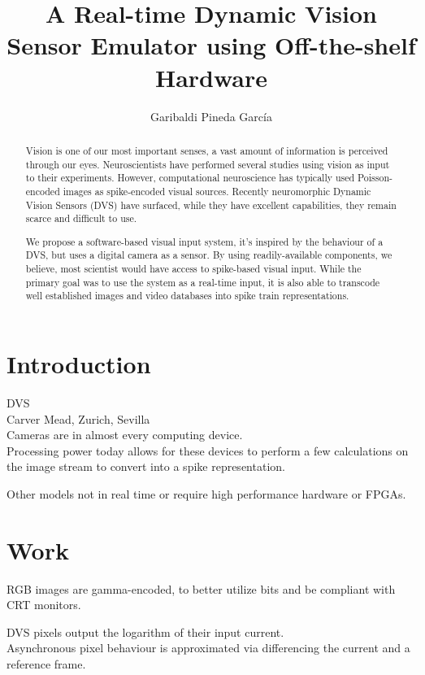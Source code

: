 \documentclass[]{article}
\title{A Real-time Dynamic Vision Sensor Emulator using Off-the-shelf Hardware}
\author{Garibaldi Pineda García}
\begin{document}
\maketitle

\begin{abstract}
Vision is one of our most important senses, a vast amount of information is perceived through our eyes. Neuroscientists have performed several studies using vision as input to their experiments. However, computational neuroscience has typically used Poisson-encoded images as spike-encoded visual sources. Recently neuromorphic Dynamic Vision Sensors (DVS) have surfaced, while they have excellent capabilities, they remain scarce and difficult to use.

We propose a software-based visual input system, it's inspired by the behaviour of a DVS, but uses a digital camera as a sensor. By using readily-available components, we believe, most scientist would have access to spike-based visual input. While the primary goal was to use the system as a real-time input, it is also able to transcode well established images and video databases into spike train representations.

\end{abstract}

\section{Introduction}
DVS\\
Carver Mead, Zurich, Sevilla\\

Cameras are in almost every computing device.\\

Processing power today allows for these devices to perform a few calculations on the image stream to convert into a spike representation.

Other models not in real time or require high performance hardware or FPGAs.


\section{Work}
RGB images are gamma-encoded, to better utilize bits and be compliant with CRT monitors.

DVS pixels output the logarithm of their input current.\\

Asynchronous pixel behaviour is approximated via differencing the current and a reference frame. \\
\end{document}
